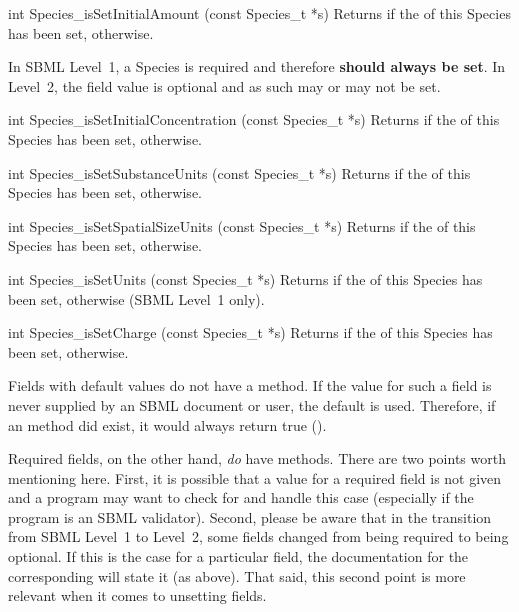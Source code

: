 \documentclass{sbmlmanual}
\begin{document}
\begin{methoddef}{int Species\_isSetInitialAmount (const Species\_t *s)}
  Returns  if the  of this Species has been set,
   otherwise.
 
  In SBML Level~1, a Species  is required and
  therefore \textbf{should always be set}.  In Level~2, the
   field value is optional and as such may or may not
  be set.
\end{methoddef}


\begin{methoddef}{int Species\_isSetInitialConcentration (const Species\_t *s)}
  Returns  if the  of this Species has
  been set,  otherwise.
\end{methoddef}


\begin{methoddef}{int Species\_isSetSubstanceUnits (const Species\_t *s)}
  Returns  if the  of this Species has been set,
   otherwise.
\end{methoddef}


\begin{methoddef}{int Species\_isSetSpatialSizeUnits (const Species\_t *s)}
  Returns  if the  of this Species has been set,
   otherwise.
\end{methoddef}


\begin{methoddef}{int Species\_isSetUnits (const Species\_t *s)}
  Returns  if the  of this Species has been set, 
  otherwise (SBML Level~1 only).
\end{methoddef}


\begin{methoddef}{int Species\_isSetCharge (const Species\_t *s)}
  Returns  if the  of this Species has been set, 
  otherwise.
\end{methoddef}


Fields with default values do not have a  method.  If
the value for such a field is never supplied by an SBML document or user,
the default is used.  Therefore, if an  method did
exist, it would always return true ().

Required fields, on the other hand, \emph{do} have 
methods.  There are two points worth mentioning here.  First, it is
possible that a value for a required field is not given and a program may
want to check for and handle this case (especially if the program is an
SBML validator).  Second, please be aware that in the transition from SBML
Level~1 to Level~2, some fields changed from being required to being
optional.  If this is the case for a particular field, the documentation
for the corresponding  will state it (as above).  That
said, this second point is more relevant when it comes to unsetting fields.
\end{document}
